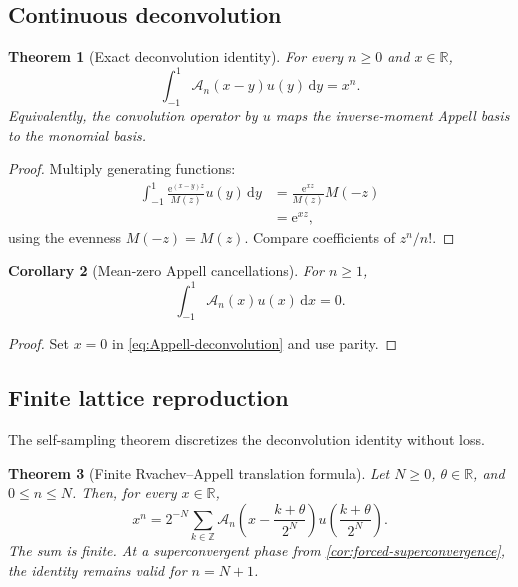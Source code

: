 \documentclass[11pt]{article}
\numberwithin{equation}{section}
\newtheorem{theorem}{Theorem}[section]
\newtheorem{corollary}[theorem]{Corollary}
\theoremstyle{definition}
\theoremstyle{remark}
\newcommand{\R}{\mathbb R}
\newcommand{\Z}{\mathbb Z}
\newcommand{\dd}{\,\mathrm d}
\newcommand{\e}{\mathrm e}
\newcommand{\Acal}{\mathscr A}
\begin{document}
\subsection{Continuous deconvolution}

\begin{theorem}[Exact deconvolution identity]
\label{thm:Appell-deconvolution}
For every $n\ge0$ and $x\in\R$,
\begin{equation}
 \boxed{\displaystyle
 \int_{-1}^{1}\Acal_n(x-y)u(y)\dd y=x^n.}
 \label{eq:Appell-deconvolution}
\end{equation}
Equivalently, the convolution operator by $u$ maps the inverse-moment Appell basis to the monomial basis.
\end{theorem}

\begin{proof}
Multiply generating functions:
\begin{align*}
 \int_{-1}^{1}\frac{\e^{(x-y)z}}{M(z)}u(y)\dd y
 &=\frac{\e^{xz}}{M(z)}M(-z)\\
 &=\e^{xz},
\end{align*}
using the evenness $M(-z)=M(z)$.  Compare coefficients of $z^n/n!$.
\end{proof}

\begin{corollary}[Mean-zero Appell cancellations]
\label{cor:Appell-mean-zero}
For $n\ge1$,
\begin{equation}
 \int_{-1}^{1}\Acal_n(x)u(x)\dd x=0.
 \label{eq:Appell-mean-zero}
\end{equation}
\end{corollary}

\begin{proof}
Set $x=0$ in \eqref{eq:Appell-deconvolution} and use parity.
\end{proof}

\subsection{Finite lattice reproduction}

The self-sampling theorem discretizes the deconvolution identity without loss.

\begin{theorem}[Finite Rvachev--Appell translation formula]
\label{thm:Appell-lattice-reproduction}
Let $N\ge0$, $\theta\in\R$, and $0\le n\le N$.  Then, for every $x\in\R$,
\begin{equation}
 \boxed{\displaystyle
 x^n=2^{-N}\sum_{k\in\Z}
 \Acal_n\!\left(x-\frac{k+\theta}{2^N}\right)
 u\!\left(\frac{k+\theta}{2^N}\right).}
 \label{eq:Appell-lattice-reproduction}
\end{equation}
The sum is finite.  At a superconvergent phase from \cref{cor:forced-superconvergence}, the identity remains valid for $n=N+1$.
\end{theorem}
\end{document}
